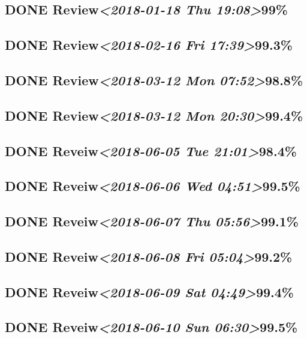 \documentclass[11pt]{ctexart}
\begin{document}
\subsection{{\bfseries\sffamily DONE} Review\textit{<2018-01-18 Thu 19:08>}99\%}
\label{sec:orgf071c1c}
\subsection{{\bfseries\sffamily DONE} Review\textit{<2018-02-16 Fri 17:39>}99.3\%}
\label{sec:orgf1a0432}
\subsection{{\bfseries\sffamily DONE} Review\textit{<2018-03-12 Mon 07:52>}98.8\%}
\label{sec:org5367225}
\subsection{{\bfseries\sffamily DONE} Review\textit{<2018-03-12 Mon 20:30>}99.4\%}
\label{sec:orge4b01e6}
\subsection{{\bfseries\sffamily DONE} Reveiw\textit{<2018-06-05 Tue 21:01>}98.4\%}
\label{sec:orga4b828b}
\subsection{{\bfseries\sffamily DONE} Reveiw\textit{<2018-06-06 Wed 04:51>}99.5\%}
\label{sec:org5e9c0a1}
\subsection{{\bfseries\sffamily DONE} Reveiw\textit{<2018-06-07 Thu 05:56>}99.1\%}
\label{sec:orgb9b97c3}
\subsection{{\bfseries\sffamily DONE} Reveiw\textit{<2018-06-08 Fri 05:04>}99.2\%}
\label{sec:org5280996}
\subsection{{\bfseries\sffamily DONE} Reveiw\textit{<2018-06-09 Sat 04:49>}99.4\%}
\label{sec:org00d1e52}
\subsection{{\bfseries\sffamily DONE} Reveiw\textit{<2018-06-10 Sun 06:30>}99.5\%}
\label{sec:org0aa3023}
\end{document}
